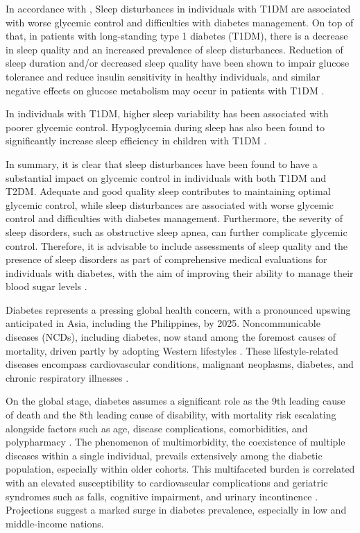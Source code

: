 In accordance with \textcite{perfect-2020}, Sleep disturbances in individuals
with T1DM are associated with worse glycemic control and difficulties with
diabetes management. On top of that, in patients with long-standing type 1
diabetes (T1DM), there is a decrease in sleep quality and an increased
prevalence of sleep disturbances. Reduction of sleep duration and/or decreased
sleep quality have been shown to impair glucose tolerance and reduce insulin
sensitivity in healthy individuals, and similar negative effects on glucose
metabolism may occur in patients with T1DM \parencite{van-dijk-2011}.

In individuals with T1DM, higher sleep variability has been associated with
poorer glycemic control. Hypoglycemia during sleep has also been found to
significantly increase sleep efficiency in children with T1DM \parencite{chontong-2016}.

In summary, it is clear that sleep disturbances have been found to have a
substantial impact on glycemic control in individuals with both T1DM and T2DM.
Adequate and good quality sleep contributes to maintaining optimal glycemic
control, while sleep disturbances are associated with worse glycemic control and
difficulties with diabetes management. Furthermore, the severity of sleep
disorders, such as obstructive sleep apnea, can further complicate glycemic
control. Therefore, it is advisable to include assessments of sleep quality and
the presence of sleep disorders as part of comprehensive medical evaluations for
individuals with diabetes, with the aim of improving their ability to manage
their blood sugar levels \parencite{hamasaki-2016}.

Diabetes represents a pressing global health concern, with a pronounced upswing
anticipated in Asia, including the Philippines, by 2025. Noncommunicable
diseases (NCDs), including diabetes, now stand among the foremost causes of
mortality, driven partly by adopting Western lifestyles
\parencite{who-2023-noncommunicable}. These lifestyle-related diseases encompass
cardiovascular conditions, malignant neoplasms, diabetes, and chronic
respiratory illnesses \parencite{cockerham-2017}.

On the global stage, diabetes assumes a significant role as the 9th leading
cause of death and the 8th leading cause of disability, with mortality risk
escalating alongside factors such as age, disease complications, comorbidities,
and polypharmacy \parencite{who-2023-mortality}. The phenomenon of
multimorbidity, the coexistence of multiple diseases within a single individual,
prevails extensively among the diabetic population, especially within older
cohorts. This multifaceted burden is correlated with an elevated susceptibility
to cardiovascular complications and geriatric syndromes such as falls, cognitive
impairment, and urinary incontinence \parencite{kirkman-2012}. Projections suggest
a marked surge in diabetes prevalence, especially in low and middle-income
nations.

